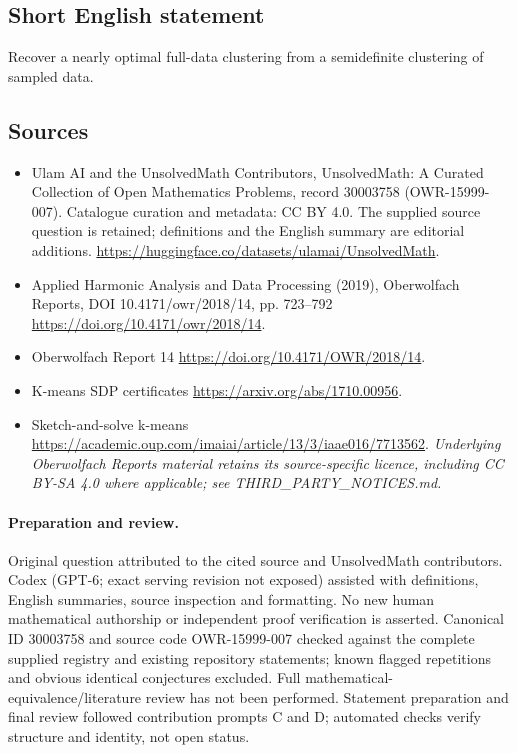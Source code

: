 \documentclass[11pt]{article}
\begin{document}
\subsection{Short English statement}
Recover a nearly optimal full-data clustering from a semidefinite clustering of sampled data.
\subsection{Sources}
\begin{itemize}
\item[\hypertarget{source:30003758:1}{S1}] Ulam AI and the UnsolvedMath Contributors, UnsolvedMath: A Curated Collection of Open Mathematics Problems, record 30003758 (OWR-15999-007). Catalogue curation and metadata: CC BY 4.0. The supplied source question is retained; definitions and the English summary are editorial additions.
\url{https://huggingface.co/datasets/ulamai/UnsolvedMath}.
\item[\hypertarget{source:30003758:2}{S2}] Applied Harmonic Analysis and Data Processing (2019), Oberwolfach Reports, DOI 10.4171/owr/2018/14, pp. 723--792
\url{https://doi.org/10.4171/owr/2018/14}.
\item[\hypertarget{source:30003758:3}{S3}] Oberwolfach Report 14
\url{https://doi.org/10.4171/OWR/2018/14}.
\item[\hypertarget{source:30003758:4}{S4}] K-means SDP certificates
\url{https://arxiv.org/abs/1710.00956}.
\item[\hypertarget{source:30003758:5}{S5}] Sketch-and-solve k-means
\url{https://academic.oup.com/imaiai/article/13/3/iaae016/7713562}.
\textit{Underlying Oberwolfach Reports material retains its source-specific licence, including CC BY-SA 4.0 where applicable; see THIRD\_PARTY\_NOTICES.md.}
\end{itemize}
\paragraph{Preparation and review.}
Original question attributed to the cited source and UnsolvedMath contributors. Codex (GPT-6; exact serving revision not exposed) assisted with definitions, English summaries, source inspection and formatting. No new human mathematical authorship or independent proof verification is asserted. Canonical ID 30003758 and source code OWR-15999-007 checked against the complete supplied registry and existing repository statements; known flagged repetitions and obvious identical conjectures excluded. Full mathematical-equivalence/literature review has not been performed. Statement preparation and final review followed contribution prompts C and D; automated checks verify structure and identity, not open status.
\label{end:30003758}
\end{document}
